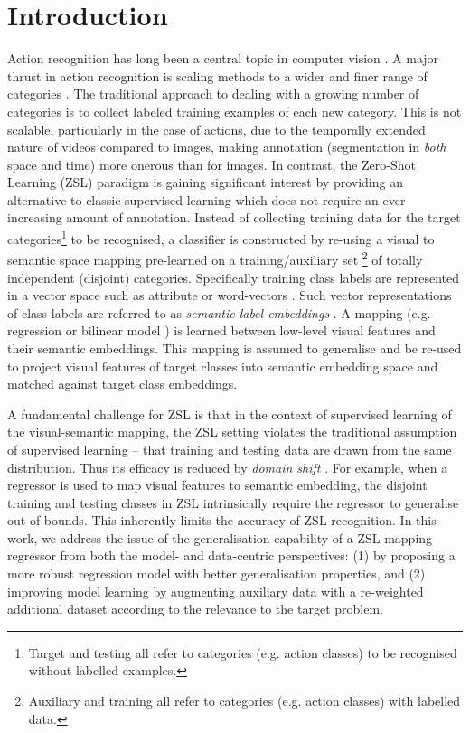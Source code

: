 \documentclass[runningheads]{llncs}
\begin{document}
\section{Introduction}
Action recognition has long been a central topic in computer vision
\cite{Aggarwal2011}. A major thrust in action recognition is scaling
methods to a wider and finer range of categories
\cite{Schuldt2004,Kuehne2011,Soomro2012}. The traditional approach to
dealing with a growing number of categories is to collect labeled
training examples of each new category. This is not scalable,
particularly in the case of actions, due to the temporally extended
nature of videos compared to images, making annotation (segmentation
in {\em both} space and time) more onerous than for images.  In
contrast, the Zero-Shot Learning (ZSL) \cite{Lampert2009,Socher2013}
paradigm is gaining significant interest by providing an alternative
to classic supervised learning which does not require an ever
increasing amount of annotation.  Instead of collecting training data for the
target categories\footnote{Target and testing all refer to
  categories (e.g. action classes) to be recognised without labelled
  examples.} to be recognised, a 
classifier is constructed by re-using a visual to semantic
space mapping pre-learned on a training/auxiliary set
\footnote{Auxiliary and
  training all refer to categories (e.g. action classes) with labelled
  data.} of totally independent (disjoint) 
categories. Specifically training class labels are represented in a vector space such as attribute \cite{Lampert2009,Akata2015} or word-vectors
\cite{Socher2013,FuXKG_CVPR15}. Such vector representations of class-labels are referred to as {\em semantic label embeddings} \cite{Akata2015}. A mapping (e.g. regression \cite{Xu2015} or bilinear
model \cite{Akata2015}) is learned between low-level visual features
and their semantic embeddings. This mapping is assumed to generalise and be re-used to project visual features of 
target classes into semantic embedding space and matched against target class embeddings.
 
A fundamental challenge for ZSL is that in the context of
supervised learning of the visual-semantic mapping, the ZSL setting
violates the traditional assumption of supervised learning
\cite{Pan2010} -- that training and testing data are drawn from the
same distribution. Thus its efficacy is reduced by \emph{domain shift}
\cite{Fu2015,dinu2014improving,Lazaridou2014}. For example, when a
regressor is used to map visual features to semantic embedding, the
disjoint training and testing classes in ZSL intrinsically require the
regressor to generalise out-of-bounds. This inherently limits the
accuracy of ZSL recognition. In this work, we address the issue of 
the generalisation capability of a ZSL mapping regressor from both the
model- and data-centric perspectives: (1) by proposing a more robust regression model
with better generalisation properties, and (2) improving model learning by 
augmenting auxiliary data  with a re-weighted additional dataset according to the relevance to the target problem.
\end{document}
